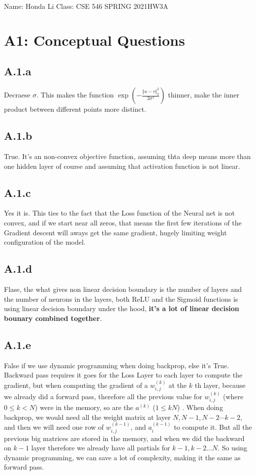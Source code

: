 \documentclass[]{article}
\begin{document}
\begin{center}
    Name: Honda Li \quad Class: CSE 546 SPRING 2021\quad HW3A
\end{center}

\section*{A1: Conceptual Questions}
    \subsection*{A.1.a}
        Decraese $\sigma$. This makes the function $\exp\left(
            - \frac{\Vert u - v\Vert_2^2}{2\sigma^2} 
        \right)$ thinner, make the inner product between different points more distinct. 
    \subsection*{A.1.b}
        True. It's an non-convex objective function, assuming thta deep means more than one hidden layer of course and assuming that activation function is not linear. 
    \subsection*{A.1.c}
        Yes it is. This ties to the fact that the Loss function of the Neural net is not convex, and if we start near all zeros, that means the first few iterations of the Gradient descent will aways get the same gradient, hugely limiting weight configuration of the model.
    \subsection*{A.1.d}
        Flase, the what gives non linear decision boundary is the number of layers and the number of neurons in the layers, both ReLU and the Sigmoid functions is using linear decision boundary under the hood, \textbf{it's a lot of linear decision bounary combined together}. 
    \subsection*{A.1.e}
        False if we use dynamic programming when doing backprop, else it's True. 
        \\
        Backward pass requires it goes for the Loss Layer to each layer to compute the gradient, but when computing the gradient of a $w_{i, j}^{(k)}$ at the $k$ th layer, because we already did a forward pass, therefore all the previous value for $w_{i, j}^{(k)}$ (where $0\le k< N$) were in the memory, so are the $a^{(k)}$ ($1\le k N$) . When doing backprop, we would need all the weight matrix at layer $N, N-1, N-2 \cdots k - 2$, and then we will need one row of $w_{i, j}^{(k - 1)}$, and $a_i^{(k-1)}$ to compute it. But all the previous big matrices are stored in the memory, and when we did the backward on $k-1$ layer therefore we already have all partials for $k-1, k - 2... N$. So using dynamic programming, we can save a lot of complexity, making it the same as forward pass. 
\end{document}
